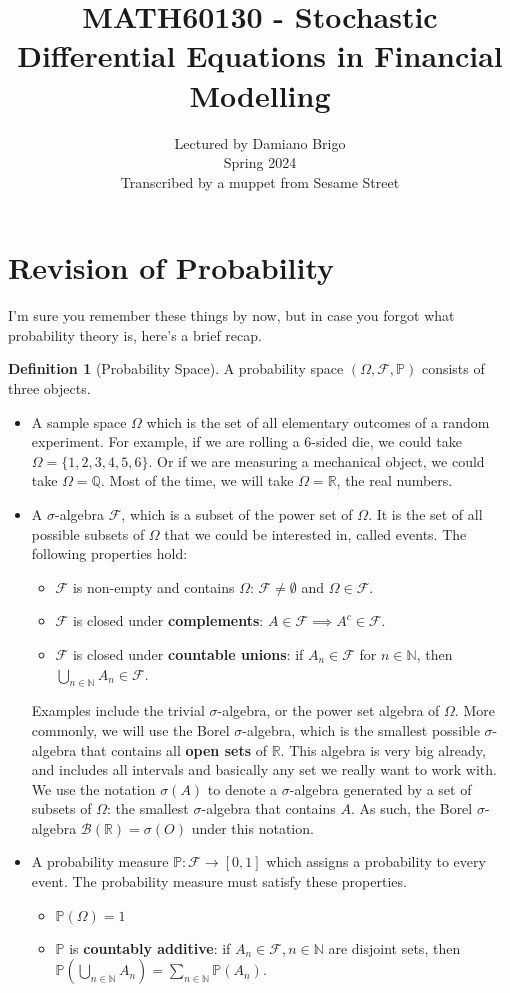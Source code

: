 \documentclass{article}
\title{
    MATH60130 - Stochastic Differential Equations in Financial Modelling}
\author{Lectured by Damiano Brigo\\
Spring 2024\\
Transcribed by a muppet from Sesame Street
}
\date{}
\numberwithin{equation}{section}
\theoremstyle{definition}
\newtheorem{definition}{Definition}[section]
\newcommand{\R}{\mathbb{R}}
\newcommand{\Q}{\mathbb{Q}}
\newcommand{\Nat}{\mathbb{N}}
\newcommand{\pr}{\mathbb{P}}
\newcommand{\mc}[1]{\mathcal{#1}}
\newcommand{\pspace}{(\Omega, \mathcal{F}, \mathbb{P})}
\newcommand{\set}[1]{\{#1\}}
\begin{document}
\maketitle


\section{Revision of Probability}
I'm sure you remember these things by now, but in case you forgot what probability theory is, here's a brief recap.
\begin{definition}[Probability Space]
    A probability space $\pspace$ consists of three objects.
    \begin{itemize}
        \item A sample space $\Omega$ which is the set of all elementary outcomes of a random experiment. For example, if we are rolling a 6-sided die, we could take $\Omega = \set{1,2,3,4,5,6}$. Or if we are measuring a mechanical object, we could take $\Omega = \Q$. Most of the time, we will take $\Omega = \R$, the real numbers.
        \item A $\sigma$-algebra $\mc{F}$, which is a subset of the power set of $\Omega$. It is the set of all possible subsets of $\Omega$ that we could be interested in, called events. The following properties hold:
        \begin{itemize}
            \item $\mc{F}$ is non-empty and contains $\Omega$: $\mc{F} \neq \emptyset$ and $\Omega \in \mc{F}$.
            \item $\mc{F}$ is closed under \textbf{complements}: $A \in \mc{F} \implies A^c \in \mc{F}$.
            \item $\mc{F}$ is closed under \textbf{countable unions}: if $A_n \in \mc{F}$ for $n \in \Nat$, then $\bigcup_{n \in \Nat} A_n \in \mc{F}$.
        \end{itemize}
        Examples include the trivial $\sigma$-algebra, or the power set algebra of $\Omega$. More commonly, we will use the Borel $\sigma$-algebra, which is the smallest possible $\sigma$-algebra that contains all \textbf{open sets} of $\R$. This algebra is very big already, and includes all intervals and basically any set we really want to work with. We use the notation $\sigma(A)$ to denote a $\sigma$-algebra generated by a set of subsets of $\Omega$: the smallest $\sigma$-algebra that contains $A$. As such, the Borel $\sigma$-algebra $\mc{B}(\R) = \sigma(O)$ under this notation.
        \item A probability measure $\pr:\mc{F} \to [0,1]$ which assigns a probability to every event. The probability measure must satisfy these properties.
        \begin{itemize}
            \item $\pr(\Omega) = 1$
            \item $\pr$ is \textbf{countably additive}: if $A_n \in \mc{F}, n \in \Nat$ are disjoint sets, then $\pr(\bigcup_{n \in \Nat} A_n) = \sum_{n \in \Nat} \pr(A_n)$.
        \end{itemize}
    \end{itemize}
\end{definition}
\end{document}
